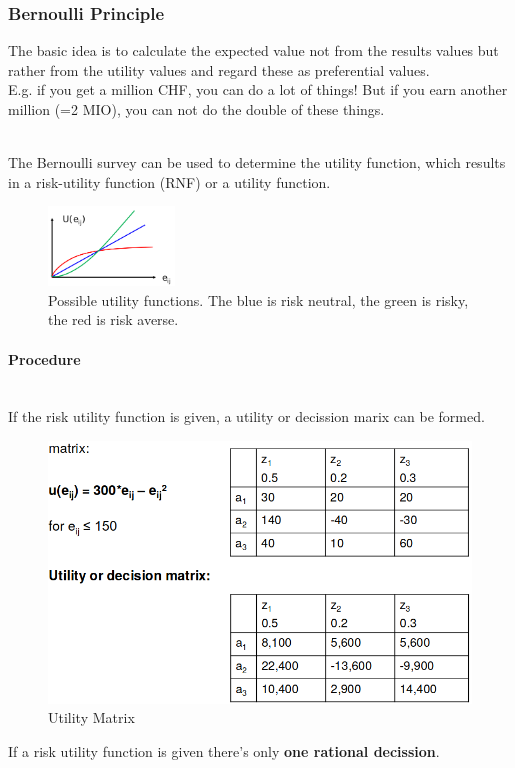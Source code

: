 \subsubsection{Bernoulli Principle}

The basic idea is to calculate the expected value not from the results
values but rather from the utility values and regard these as preferential
values.\\
E.g. if you get a million CHF, you can do a lot of things! But if you
earn another million (=2 MIO), you can not do the double of these
things.

\mbox{}\\
The Bernoulli survey can be used to determine the utility function,
which results in a risk-utility function (RNF) or a utility function.


\begin{figure}[H]
\centering
\includegraphics[width=0.3\textwidth]{figures/utilityFunction.png}
\caption{Possible utility functions. The blue is risk neutral, the green is risky, the red is risk averse.}
\end{figure}

\paragraph{Procedure}
\mbox{}\\
If the risk utility function is given, a utility or decission marix can
be formed.

\begin{figure}[H]
\centering
\includegraphics[width=.5\textwidth]{figures/utilitymatrix.png}
\caption{Utility Matrix}
\end{figure}

If a risk utility function is given there's only \textbf{one rational
decission}.
